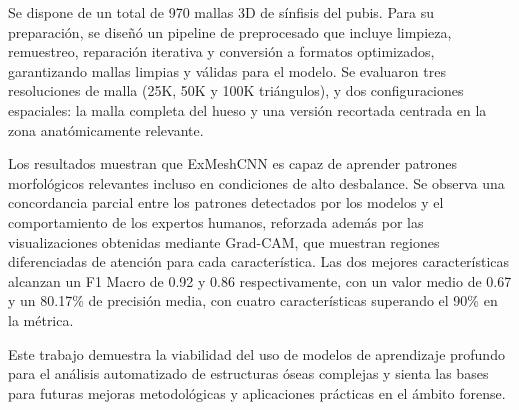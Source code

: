 Se dispone de un total de 970 mallas 3D de sínfisis del pubis. Para su preparación, se diseñó un pipeline de preprocesado que incluye limpieza, remuestreo, reparación iterativa y conversión a formatos optimizados, garantizando mallas limpias y válidas para el modelo. Se evaluaron tres resoluciones de malla (25K, 50K y 100K triángulos), y dos configuraciones espaciales: la malla completa del hueso y una versión recortada centrada en la zona anatómicamente relevante.

Los resultados muestran que ExMeshCNN es capaz de aprender patrones morfológicos relevantes incluso en condiciones de alto desbalance. Se observa una concordancia parcial entre los patrones detectados por los modelos y el comportamiento de los expertos humanos, reforzada además por las visualizaciones obtenidas mediante Grad-CAM, que muestran regiones diferenciadas de atención para cada característica. Las dos mejores características alcanzan un F1 Macro de 0.92 y 0.86 respectivamente, con un valor medio de 0.67 y un 80.17\% de precisión media, con cuatro características superando el 90\% en la métrica.

Este trabajo demuestra la viabilidad del uso de modelos de aprendizaje profundo para el análisis automatizado de estructuras óseas complejas y sienta las bases para futuras mejoras metodológicas y aplicaciones prácticas en el ámbito forense. 

\newpage
\thispagestyle{empty}


\begin{center}
{\large\bfseries \myTitleENG} \\
\end{center}
\begin{center}
\myName \\
\end{center}

\vspace{0.7cm}
 \\

\vspace{0.7cm}
 \\

